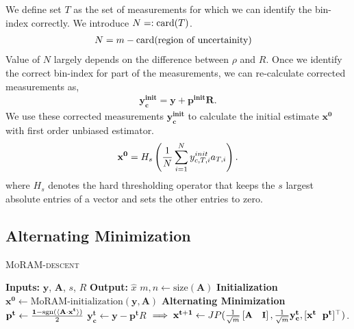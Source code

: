 We define set $T$ as the set of measurements for which we can identify the bin-index correctly. We introduce $N=: \mathrm{card}(T)$.
\begin{align*}
N & =  m - \mathrm{card}(\textnormal{region of uncertainity})
\end{align*}
Value of $N$ largely depends on the difference between $\rho$ and $R$.
Once we identify the correct bin-index for part of the measurements, we can re-calculate corrected measurements as,
\begin{align}
\mathbf{y^{init}_{c} = y + p^{init}R}.
\label{eq:y_init}
\end{align}
We use these corrected measurements $\mathbf{y^{init}_{c}}$ to calculate the initial estimate $\mathbf{{x}^0}$ with first order unbiased estimator.%
\begin{equation}
\mathbf{x^0} = H_s\left( \frac{1}{N}\sum_{i=1}^{N}y^{init}_{c,T,i}a_{T,i}\right).
\label{eq:init}
\end{equation}
where $H_s$ denotes the hard thresholding operator that keeps the $s$ largest absolute entries of a vector and sets the other entries to zero.
\subsection{Alternating Minimization}
\label{sec:altmin}
\begin{algorithm}[H]
	\caption{\textsc{MoRAM-descent}}
	\label{alg:MoRAM}
	\begin{algorithmic}
		\State\textbf{Inputs:} $\mathbf{y}$, $\mathbf{A}$, $s$, $R$
		\State\textbf{Output:}  $\widehat{x}$
		\State $m,n \leftarrow \mathrm{size}(\mathbf{A})$ 
		\State \textbf{Initialization}
		\State $\mathbf{x^0} \leftarrow \textrm{MoRAM-initialization}(\mathbf{y, A})$ 
		\State \textbf{Alternating Minimization}
		\State $\mathbf{{p}^{t}} \leftarrow \frac{\mathbf{1}-\mathrm{sgn}(\langle \mathbf{A} \cdot \mathbf{x^t} \rangle)}{2}$
		\State $\mathbf{y^t_c} \leftarrow \mathbf{y} - \mathbf{p^t}R$
		\State $\implies \mathbf{{x}^{t+1}}\leftarrow \small{JP(\frac{1}{\sqrt{m}}\begin{bmatrix} \mathbf{A} & \mathbf{I} \end{bmatrix},\frac{1}{\sqrt{m}}\mathbf{y^t_c},[\mathbf{x^t~~p^t}]^\top)}$.
		\EndFor
	\end{algorithmic}
\end{algorithm}

